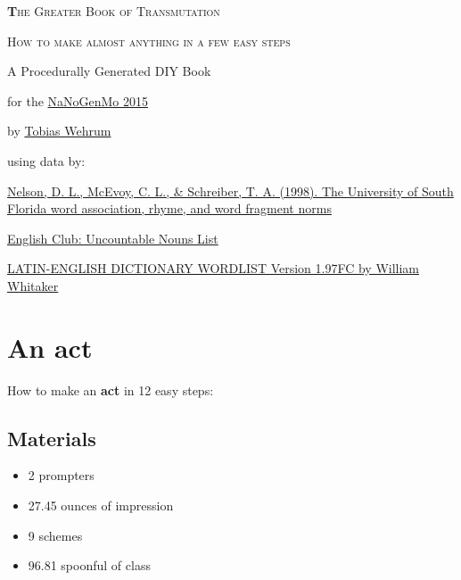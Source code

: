 \documentclass{article}
\title{}
\author{}
\date{}
\begin{document}
\begin{titlepage}
\centering
{\scshape\Huge\textbf The Greater Book of Transmutation \par}
\vspace{1.5cm}
{\scshape\large How to make almost anything in a few easy steps \par}
\vspace{5.5cm}
{\large A Procedurally Generated DIY Book \par}
{\large for the \href{https://github.com/dariusk/NaNoGenMo-2015}{NaNoGenMo 2015} \par}
\vspace{0.5cm}
{\large by \href{http://dragonlab.de}{Tobias Wehrum} \par}
\vfill
{\scriptsize using data by: \par}
\vspace{0.3cm}
{\scriptsize\href{http://web.usf.edu/FreeAssociation}{Nelson, D. L., McEvoy, C. L., \& Schreiber, T. A. (1998). The University of South Florida word association, rhyme, and word fragment norms}\par}
\vspace{0.3cm}
{\scriptsize\href{https://www.englishclub.com/vocabulary/nouns-uncountable-list.htm}{English Club: Uncountable Nouns List}\par}
\vspace{0.3cm}
{\scriptsize\href{http://archives.nd.edu/whitaker/dictpage.htm}{LATIN-ENGLISH DICTIONARY WORDLIST Version 1.97FC by William Whitaker}\par}
\vspace{0.5cm}
\end{titlepage}

\setcounter{tocdepth}{1}
\renewcommand*\contentsname{How to make...}
\tableofcontents
\newpage
\section{An act}How to make an \textbf{act} in 12 easy steps:

\subsection{Materials}\begin{itemize}
\item 
2 prompters
\item 
27.45 ounces of impression
\item 
9 schemes
\item 
96.81 spoonful of class
\end{itemize}
\end{document}
